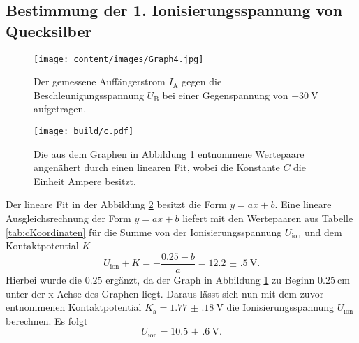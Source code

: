 \subsection{Bestimmung der 1. Ionisierungsspannung von Quecksilber}
\begin{figure}
	\centering
	\caption{Der gemessene Auffängerstrom $I_\text{A}$ gegen die Beschleunigungsspannung $U_\text{B}$ bei einer Gegenspannung von $\SI{-30}{\volt}$ aufgetragen.}
	\texttt{[image: content/images/Graph4.jpg]}
	\label{fig:c}
\end{figure}
\begin{figure}
	\centering
	\caption{Die aus dem Graphen in Abbildung \ref{fig:c} entnommene Wertepaare angenähert durch einen linearen Fit, wobei die Konstante $C$ die Einheit Ampere besitzt.}
	\texttt{[image: build/c.pdf]}
	\label{fig:cion}
\end{figure}
\begin{table}
	\caption{Die aus dem Graphen in Abbildung \ref{fig:c} entnommenen Wertepaare, wobei die Konstante $C$ die Einheit Ampere besitzt.}
	\centering
	
\end{table}
Der lineare Fit in der Abbildung \ref{fig:cion} besitzt die Form $y=a x + b$. Eine lineare Ausgleichsrechnung der Form $y=a x+b$ liefert mit den Wertepaaren aus Tabelle \ref{tab:cKoordinaten} für die Summe von der Ionisierungsspannung $U_\text{ion}$ und dem Kontaktpotential $K$
\begin{displaymath}
	U_\text{ion}+K=-\frac{\num{0.25}-b}{a}=\SI{12.2(5)}{\volt}\text{.}
\end{displaymath}
Hierbei wurde die $\num{0.25}$ ergänzt, da der Graph in Abbildung \ref{fig:c} zu Beginn $\SI{0.25}{\centi\meter}$ unter der x-Achse des Graphen liegt.
Daraus lässt sich nun mit dem zuvor entnommenen Kontaktpotential $K_\text{a}=\SI{1.77(18)}{\volt}$ die Ionisierungsspannung $U_\text{ion}$ berechnen. Es folgt
\begin{displaymath}
U_\text{ion}=\SI{10.5(6)}{\volt}\text{.}
\end{displaymath}
